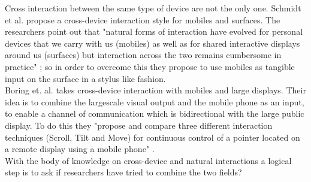 Cross interaction between the same type of device are not the only one. Schmidt et al. propose a cross-device interaction style for mobiles and surfaces. The researchers point out that "natural forms of interaction have evolved for personal devices that we carry with us (mobiles) as well as for shared interactive displays around us (surfaces) but interaction across the two remains cumbersome in practice" \cite{Schmidt:2012}; so in order to overcome this they propose to use mobiles as tangible input on the surface in a stylus like fashion.\\

Boring et. al. takes cross-device interaction with mobiles and large displays. Their idea is to combine the largescale visual output and the mobile phone as an input, to enable a channel of communication which is bidirectional with the large public display. To do this they "propose and compare three different interaction techniques (Scroll, Tilt and Move) for continuous control of a pointer located on a remote display using a mobile phone" \cite{Boring:2009}.\\

With the body of knowledge on cross-device and natural interactions a logical step is to ask if researchers have tried to combine the two fields?
